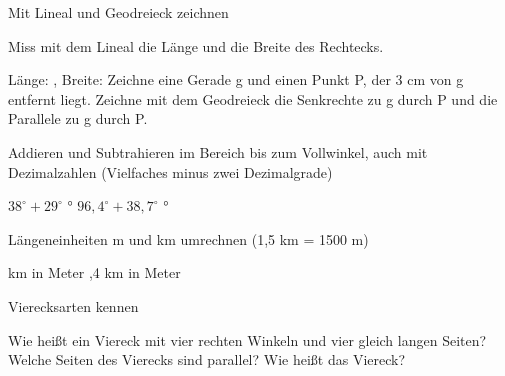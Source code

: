 \setcounter{aufgabe}{0}

\begin{aufgabe}{Mit Lineal und Geodreieck zeichnen}
\begin{teile}
\teil Miss mit dem Lineal die Länge und die Breite des Rechtecks.

Länge: \leerfeld[cm] , Breite: \leerfeld[cm]
\teil Zeichne eine Gerade g und einen Punkt P, der 3 cm von g entfernt liegt. Zeichne mit dem Geodreieck die Senkrechte zu g durch P und die Parallele zu g durch P.

\begin{ksys}[xmin=0,xmax=10,ymin=0,ymax=6] \end{ksys}
\end{teile}
\end{aufgabe}

\begin{aufgabe}{Addieren und Subtrahieren im Bereich bis zum Vollwinkel, auch mit Dezimalzahlen (Vielfaches minus zwei Dezimalgrade)}
\begin{teile}
\teil $38^\circ + 29^\circ$ \leerfeld °
\teil $96{,}4^\circ + 38{,}7^\circ$ \leerfeld °
\end{teile}
\end{aufgabe}

\begin{aufgabe}{Längeneinheiten m und km umrechnen (1,5 km = 1500 m)}
\begin{teile}
 km in Meter \leerfeld[m]
,4 km in Meter \leerfeld[m]
\end{teile}
\end{aufgabe}

\begin{aufgabe}{Vierecksarten kennen}
\begin{teile}
\teil Wie heißt ein Viereck mit vier rechten Winkeln und vier gleich langen Seiten? \leerfeld
\teil Welche Seiten des Vierecks sind parallel? Wie heißt das Viereck?

\end{teile}
\end{aufgabe}

